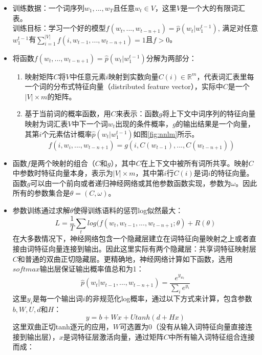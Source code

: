 \documentclass[master]{njuthesis}
\begin{document}
\begin{itemize}
\item 训练数据：一个词序列$w_1, ..., w_T$且任意$w_t \in V$，这里$V$是一个大的有限词汇表。\\
		训练目标：学习一个好的模型$f(w_t, ..., w_{t-n+1}) = \hat{p}(w_t|w_{1}^{t-1})$, 满足对任意$w_{1}^{t-1}$有$\sum_{i=1}^{|V|}f(i, w_{t-1}, ..., w_{t-n+1}) = 1$且$f>0$。
\item 将函数$f(w_t, ..., w_{t-n+1}) = \hat{p}(w_t|w_{1}^{t-1})$分解为两部分：
	\begin{enumerate}
	\item 映射矩阵$C$将$V$中任意元素$i$映射到实数向量$C(i) \in \mathbb{R}^m$，代表词汇表里每一个词的分布式特征向量（distributed feature vector），实际中$C$是一个$|V| \times m$的矩阵。
	\item 基于当前词的概率函数，用$C$来表示：函数$g$将上下文中词序列的特征向量映射为词汇表$V$中下一个词$w_t$出现的条件概率，$g$的输出结果是一个向量，其第$i$个元素估计概率$ \hat{p}(w_t|w_{1}^{t-1})$如图\ref{fig:nnlm}所示。
		\begin{equation}
		f(i, w_i, ..., w_{t-n+1}) = g(i, C(w_{t-1}), ..., C(w_{t-n+1}))
		\end{equation}
	\end{enumerate}
\item 函数$f$是两个映射的组合（$C$和$g$），其中$C$在上下文中被所有词所共享。映射$C$中参数时特征向量本身，表示为$|V| \times m$，其中第$i$行$C(i)$是词$i$的特征向量。函数$g$可以由一个前向或者递归神经网络或其他参数函数实现，参数为$\omega $。因此所有的参数集合是$\theta=(C, \omega)$。
\item 参数训练通过求解$\theta$使得训练语料的惩罚log似然最大：
		\begin{equation}
		L=\frac{1}{T}\sum_{t}log(f(w_t,w_{t-1},...,w_{t-n+1};\theta)+R(\theta)
		\end{equation}
		在大多数情况下，神经网络包含一个隐藏层建立在词特征向量映射之上或者直接由词特征向量连接到输出。因此这里实际有两个隐藏层：共享词特征映射层$C$和普通的双曲正切隐藏层。更精确地，神经网络计算如下函数，选用$softmax$输出层保证输出概率值总和为1：
		\begin{equation}
		\hat{p}(w_t|w_{t-1}, ..., w_{t-n+1})=\frac{e^{y_{w_t}}}{\sum_{i}e^{y_i}}
		\end{equation}
		这里$y_i$是每一个输出词$i$的非规范化log概率，通过以下方式来计算，包含参数$b,W,U,d$和$H$：
		\begin{equation}
		y=b+Wx+Utanh(d+Hx)
		\end{equation}
		这里双曲正切tanh逐元的应用，$W$可选置为0（没有从输入词特征向量直接连接到输出层），$x$是词特征层激活向量，通过矩阵$C$中所有输入词特征组合连接而成：

\end{itemize}
\end{document}
